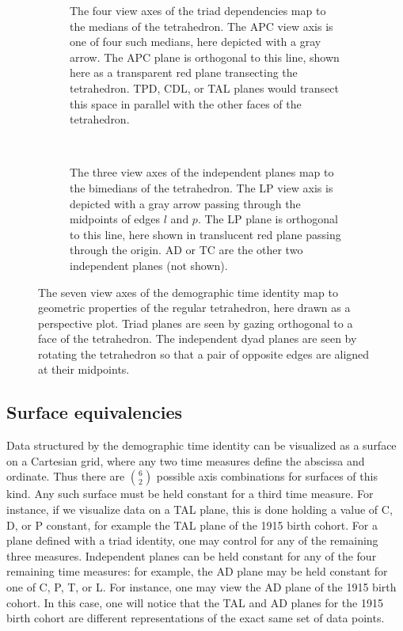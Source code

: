 \documentclass{bmcart}
\begin{document}
\begin{figure}
\begin{subfigure}[t]{0.45\linewidth}
    \centering
    \resizebox{\linewidth}{\linewidth}{
    
    }
    \caption{The four view axes of the triad dependencies map to the medians of the tetrahedron. The APC view axis is one of four such medians, here depicted with a gray arrow. The APC plane is orthogonal to this line, shown here as a transparent red plane transecting the tetrahedron. TPD, CDL, or TAL planes would transect this space in parallel with the other faces of the tetrahedron.}
    \label{fig:depviewaxes}
\end{subfigure}
~~
\begin{subfigure}[t]{0.45\linewidth}
    \resizebox{\linewidth}{\linewidth}{
     
     }
    \caption{The three view axes of the independent planes map to the bimedians of the tetrahedron. The LP view axis is depicted with a gray arrow passing through the midpoints of edges $l$ and $p$. The LP plane is orthogonal to this line, here shown in translucent red plane passing through the origin. AD or TC are the other two independent planes (not shown).}
    \label{fig:indepviewaxes}       
\end{subfigure}
\caption{The seven view axes of the demographic time identity map to geometric properties of the regular tetrahedron, here drawn as a perspective plot. Triad planes are seen by gazing orthogonal to a face of the tetrahedron. The independent dyad planes are seen by rotating the tetrahedron so that a pair of opposite edges are aligned at their midpoints. }
\label{fig:viewaxes}
\end{figure}



\FloatBarrier
\subsection*{Surface equivalencies}
Data structured by the demographic time identity can be visualized as a surface on a Cartesian grid, where any two time measures define the abscissa and ordinate. Thus there are $\binom{6}{2}$ possible axis combinations for surfaces of this kind. Any such surface must be held constant for a third time measure. For instance, if we visualize data on a TAL plane, this is done holding a value of C, D, or P constant, for example the TAL plane of the 1915 birth cohort. For a plane defined with a triad identity, one may control for any of the remaining three measures. Independent planes can be held constant for any of the four remaining time measures: for example, the AD plane may be held constant for one of C, P, T, or L. For instance, one may view the AD plane of the 1915 birth cohort. In this case, one will notice that the TAL and AD planes for the 1915 birth cohort are different representations of the exact same set of data points.
\end{document}
